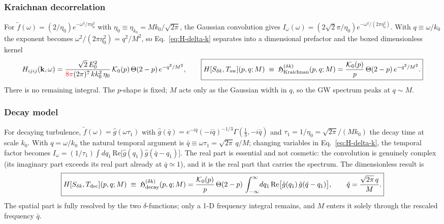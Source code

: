 \documentclass[10pt,prd,aps,nobibnotes,superscriptaddress,preprintnumbers,notitlepage]{revtex4-1}
\newcommand{\add}[1]{{\color{red}#1}}
\newcommand{\add}[1]{#1}
\newcommand{\kb}{{\bf k}}
\newcommand{\tf}{\tilde{f}}
\begin{document}
\subsubsection{Kraichnan decorrelation}
\label{sec:delta-kraichnan}

For $\tf(\omega)=(2/\eta_0)e^{-\omega^2/\pi\eta_0^2}$ with $\eta_0\equiv\eta_{k_0}=M k_0/\sqrt{2\pi}$, the Gaussian convolution gives $I_\omega(\omega) = (2\sqrt{2}\pi/\eta_0)e^{-\omega^2/(2\pi\eta_0^2)}$. With $q\equiv\omega/k_0$ the exponent becomes $\omega^2/(2\pi\eta_0^2)=q^2/M^2$, so Eq.~\eqref{eq:H-delta-k} separates into a dimensional prefactor and the boxed dimensionless kernel
\begin{equation}
  H_{ijij}(\kb,\omega) = \frac{\sqrt{2}\,E_0^2}{\add{8\pi}(2\pi)^7\,k k_0^2\,\eta_0}\,\mathcal{K}_0(p)\,\Theta(2-p)\,e^{-q^2/M^2},
  \qquad
  \boxed{
  H[S_{\delta k},T_{\rm sw}](p,q;M)\;\equiv\;\mathfrak{H}^{(\delta k)}_{\rm Kraichnan}(p,q;M) = \frac{\mathcal{K}_0(p)}{p}\,\Theta(2-p)\,e^{-q^2/M^2}.
  }
  \label{eq:dimless-delta-Kraichnan}
\end{equation}
There is no remaining integral. The $p$-shape is fixed; $M$ acts only as the Gaussian width in $q$, so the GW spectrum peaks at $q\sim M$.

\subsubsection{Decay model}
\label{sec:delta-decay}

For decaying turbulence, $\tf(\omega)=\hat g(\omega\tau_1)$ with $\hat g(\bar q)=e^{-i\bar q}(-i\bar q)^{-1/3}\Gamma(\tfrac{1}{3},-i\bar q)$ and $\tau_1=1/\eta_0=\sqrt{2\pi}/(M k_0)$ the decay time at scale $k_0$. With $q=\omega/k_0$ the natural temporal argument is $\bar q\equiv\omega\tau_1=\sqrt{2\pi}\,q/M$; changing variables in Eq.~\eqref{eq:H-delta-k}, the temporal factor becomes $I_\omega=(1/\tau_1)\!\int dq_1\,\mathrm{Re}\bigl[\hat g(q_1)\hat g(\bar q-q_1)\bigr]$. The real part is essential and not cosmetic: the convolution is genuinely complex (its imaginary part exceeds its real part already at $\bar q\simeq1$), and it is the real part that carries the spectrum. The dimensionless result is
\begin{equation}
  \boxed{
  H[S_{\delta k},T_{\rm dec}](p,q;M)\;\equiv\;\mathfrak{H}^{(\delta k)}_{\rm decay}(p,q;M) = \frac{\mathcal{K}_0(p)}{p}\,\Theta(2-p)\,\int_{-\infty}^\infty\!dq_1\,\mathrm{Re}\bigl[\hat g(q_1)\,\hat g(\bar q-q_1)\bigr],
  \qquad \bar q=\frac{\sqrt{2\pi}\,q}{M}.
  }
  \label{eq:dimless-delta-decay}
\end{equation}
The spatial part is fully resolved by the two $\delta$-functions; only a 1-D frequency integral remains, and $M$ enters it solely through the rescaled frequency $\bar q$.
\end{document}
